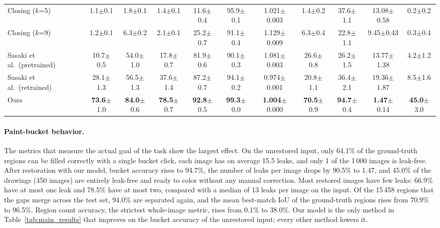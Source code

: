 \documentclass[preprint,12pt]{elsarticle}
\begin{document}
\begin{table}
{\begin{tabular}{lcccccccccc}
Closing ($k$=5) & 1.1{\scriptsize$\pm$0.1} & 1.8{\scriptsize$\pm$0.1} & 1.4{\scriptsize$\pm$0.1} & 11.6{\scriptsize$\pm$0.4} & 95.9{\scriptsize$\pm$0.1} & 1.021{\scriptsize$\pm$0.003} & 1.4{\scriptsize$\pm$0.2} & 37.6{\scriptsize$\pm$1.1} & 13.08{\scriptsize$\pm$0.58} & 0.2{\scriptsize$\pm$0.2} \\
Closing ($k$=9) & 1.2{\scriptsize$\pm$0.1} & 6.3{\scriptsize$\pm$0.2} & 2.1{\scriptsize$\pm$0.1} & 25.2{\scriptsize$\pm$0.7} & 91.1{\scriptsize$\pm$0.4} & 1.129{\scriptsize$\pm$0.009} & 6.3{\scriptsize$\pm$0.4} & 22.8{\scriptsize$\pm$1.1} & 9.45{\scriptsize$\pm$0.43} & 0.3{\scriptsize$\pm$0.4} \\
Sasaki et al.\ (pretrained) & 10.7{\scriptsize$\pm$0.5} & 54.0{\scriptsize$\pm$1.0} & 17.8{\scriptsize$\pm$0.7} & 81.9{\scriptsize$\pm$0.6} & 90.1{\scriptsize$\pm$0.3} & 1.081{\scriptsize$\pm$0.003} & 26.6{\scriptsize$\pm$0.8} & 26.2{\scriptsize$\pm$1.5} & 13.77{\scriptsize$\pm$1.38} & 4.2{\scriptsize$\pm$1.2} \\
Sasaki et al.\ (retrained) & 28.1{\scriptsize$\pm$1.3} & 56.5{\scriptsize$\pm$1.3} & 37.6{\scriptsize$\pm$1.4} & 87.2{\scriptsize$\pm$0.7} & 94.1{\scriptsize$\pm$0.2} & 0.974{\scriptsize$\pm$0.001} & 20.8{\scriptsize$\pm$1.1} & 36.4{\scriptsize$\pm$2.1} & 19.36{\scriptsize$\pm$1.87} & 8.5{\scriptsize$\pm$1.6} \\
Ours & \textbf{73.6}{\scriptsize$\pm$1.0} & \textbf{84.0}{\scriptsize$\pm$0.6} & \textbf{78.5}{\scriptsize$\pm$0.7} & \textbf{92.8}{\scriptsize$\pm$0.5} & \textbf{99.3}{\scriptsize$\pm$0.0} & \textbf{1.004}{\scriptsize$\pm$0.000} & \textbf{70.5}{\scriptsize$\pm$0.9} & \textbf{94.7}{\scriptsize$\pm$0.4} & \textbf{1.47}{\scriptsize$\pm$0.14} & \textbf{45.0}{\scriptsize$\pm$3.0} \\
\bottomrule
\end{tabular}}
\end{table}

\paragraph{Paint-bucket behavior.} The metrics that measure the actual goal of the
task show the largest effect. On the unrestored input, only 64.1\% of the
ground-truth regions can be filled correctly with a single bucket click, each image
has on average 15.5 leaks, and only 1 of the 1\,000 images is leak-free. After
restoration with our model, bucket accuracy rises to 94.7\%, the number of leaks per
image drops by 90.5\% to 1.47, and 45.0\% of the drawings (450 images) are entirely
leak-free and ready to color without any manual correction. Most restored images have few leaks: 66.9\% have at most one leak and
78.5\% have at most two, compared with a median of 13 leaks per image on the input.
Of the 15\,458 regions that the gaps merge across the test set, 94.0\% are separated
again, and the mean best-match IoU of the ground-truth regions rises from 70.9\% to
96.5\%. Region count accuracy, the strictest whole-image metric, rises from 0.1\% to
38.0\%. Our model is the only method in Table~\ref{tab:main_results} that improves
on the bucket accuracy of the unrestored input; every other method lowers it.
\end{document}

